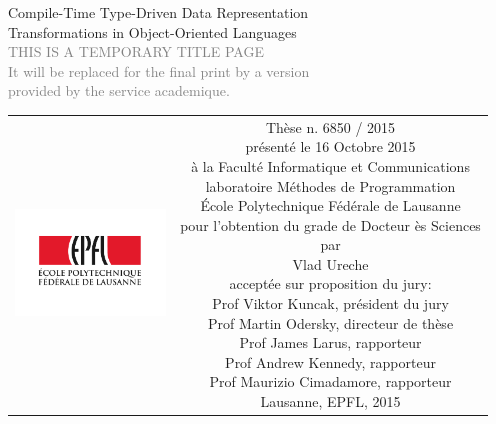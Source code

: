 \begin{titlepage}
\begin{center}
\sffamily


\null\vspace{2cm}
{\huge Compile-Time Type-Driven Data Representation\\[12pt] Transformations in Object-Oriented Languages} \\[24pt]
\textcolor{gray}{\small{THIS IS A TEMPORARY TITLE PAGE \\ It will be replaced for the final print by a version \\ provided by the service academique.}}

\vfill

\begin{tabular} {cc}
\parbox{0.3\textwidth}{\includegraphics[width=4cm]{images/epfl}}
&
\parbox{0.7\textwidth}{%
	Thèse n. 6850 / 2015\\
	présenté le 16 Octobre 2015\\
	à la Faculté Informatique et Communications\\
	laboratoire Méthodes de Programmation\\[2em]
%
	École Polytechnique Fédérale de Lausanne\\[6pt]
	pour l'obtention du grade de Docteur ès Sciences\\
	par\\ [4pt]
	\null \hspace{3em} Vlad Ureche\\[9pt]
%
\small
acceptée sur proposition du jury:\\[4pt]
%
    Prof Viktor Kuncak, président du jury\\
    Prof Martin Odersky, directeur de thèse\\
    Prof James Larus, rapporteur\\
    Prof Andrew Kennedy, rapporteur\\
    Prof Maurizio Cimadamore, rapporteur\\[12pt]
%
Lausanne, EPFL, 2015}
\end{tabular}
\end{center}
\vspace{2cm}
\end{titlepage}



